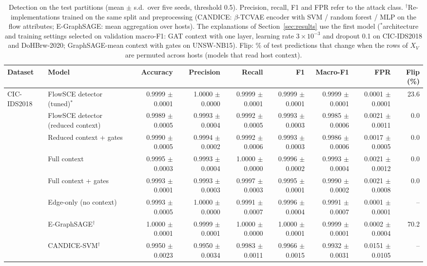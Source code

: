 \begin{table}[t]
\centering\footnotesize
\caption{Detection on the test partitions (mean $\pm$ s.d.\ over five seeds, threshold 0.5). Precision, recall, F1 and FPR refer to the attack class. $^\dagger$Re-implementations trained on the same split and preprocessing (CANDICE: $\beta$-TCVAE encoder with SVM / random forest / MLP on the flow attributes; E-GraphSAGE: mean aggregation over hosts). The explanations of Section~\ref{sec:results} use the first model ($^\ast$architecture and training settings selected on validation macro-F1: GAT context with one layer, learning rate $3\times10^{-3}$ and dropout 0.1 on CIC-IDS2018 and DoHBrw-2020; GraphSAGE-mean context with gates on UNSW-NB15). Flip: \% of test predictions that change when the rows of $X_V$ are permuted across hosts (models that read host context).}
\label{tab:detector}
\begin{tabular}{@{}llrrrrrrr@{}}
\toprule
Dataset & Model & Accuracy & Precision & Recall & F1 & Macro-F1 & FPR & Flip (\%) \\
\midrule
CIC-IDS2018 & FlowSCE detector (tuned)$^\ast$ & 0.9999 $\pm$ 0.0001 & 1.0000 $\pm$ 0.0000 & 0.9999 $\pm$ 0.0001 & 0.9999 $\pm$ 0.0001 & 0.9999 $\pm$ 0.0001 & 0.0001 $\pm$ 0.0001 & 23.6 \\
 & FlowSCE detector (reduced context) & 0.9989 $\pm$ 0.0005 & 0.9993 $\pm$ 0.0004 & 0.9992 $\pm$ 0.0005 & 0.9993 $\pm$ 0.0003 & 0.9985 $\pm$ 0.0006 & 0.0021 $\pm$ 0.0011 & 0.0 \\
 & Reduced context + gates & 0.9990 $\pm$ 0.0005 & 0.9994 $\pm$ 0.0002 & 0.9992 $\pm$ 0.0006 & 0.9993 $\pm$ 0.0003 & 0.9986 $\pm$ 0.0006 & 0.0017 $\pm$ 0.0005 & 0.0 \\
 & Full context & 0.9995 $\pm$ 0.0003 & 0.9993 $\pm$ 0.0004 & 1.0000 $\pm$ 0.0000 & 0.9996 $\pm$ 0.0002 & 0.9993 $\pm$ 0.0004 & 0.0021 $\pm$ 0.0012 & 0.0 \\
 & Full context + gates & 0.9993 $\pm$ 0.0001 & 0.9993 $\pm$ 0.0003 & 0.9997 $\pm$ 0.0003 & 0.9995 $\pm$ 0.0001 & 0.9990 $\pm$ 0.0002 & 0.0021 $\pm$ 0.0008 & 0.0 \\
 & Edge-only (no context) & 0.9993 $\pm$ 0.0005 & 1.0000 $\pm$ 0.0000 & 0.9991 $\pm$ 0.0007 & 0.9996 $\pm$ 0.0004 & 0.9991 $\pm$ 0.0007 & 0.0001 $\pm$ 0.0001 & -- \\
 & E-GraphSAGE$^\dagger$ & 1.0000 $\pm$ 0.0001 & 0.9999 $\pm$ 0.0001 & 1.0000 $\pm$ 0.0000 & 1.0000 $\pm$ 0.0001 & 0.9999 $\pm$ 0.0001 & 0.0002 $\pm$ 0.0004 & 70.2 \\
 & CANDICE-SVM$^\dagger$ & 0.9950 $\pm$ 0.0023 & 0.9950 $\pm$ 0.0034 & 0.9983 $\pm$ 0.0011 & 0.9966 $\pm$ 0.0015 & 0.9932 $\pm$ 0.0031 & 0.0151 $\pm$ 0.0105 & -- \\

\end{tabular}
\end{table}
